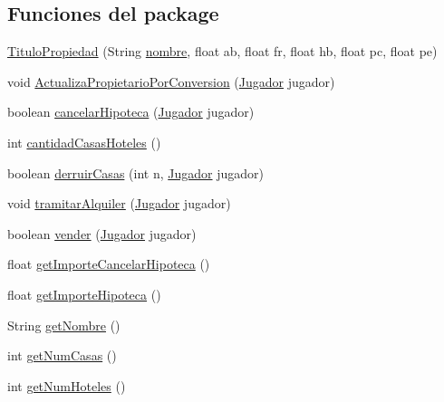 \subsection*{Funciones del \textquotesingle{}package\textquotesingle{}}
\begin{DoxyCompactItemize}
\item 
\hyperlink{classcivitas_1_1TituloPropiedad_ace9e509977e1a3df5ee0cab4cc150622}{Titulo\+Propiedad} (String \hyperlink{classcivitas_1_1TituloPropiedad_a7542ca29c4635b8cb3c56558ed7c5096}{nombre}, float ab, float fr, float hb, float pc, float pe)
\item 
void \hyperlink{classcivitas_1_1TituloPropiedad_a4f7d2ebddd0012032245a7e1c52b6334}{Actualiza\+Propietario\+Por\+Conversion} (\hyperlink{classcivitas_1_1Jugador}{Jugador} jugador)
\item 
boolean \hyperlink{classcivitas_1_1TituloPropiedad_a85a5b8fcd43a0dd67b4700e8bc6dd969}{cancelar\+Hipoteca} (\hyperlink{classcivitas_1_1Jugador}{Jugador} jugador)
\item 
int \hyperlink{classcivitas_1_1TituloPropiedad_ab7971a3c2b326c05da54da18c4f12f4b}{cantidad\+Casas\+Hoteles} ()
\item 
boolean \hyperlink{classcivitas_1_1TituloPropiedad_a61e1dfd0ba431e4ae30c459f93b0c343}{derruir\+Casas} (int n, \hyperlink{classcivitas_1_1Jugador}{Jugador} jugador)
\item 
void \hyperlink{classcivitas_1_1TituloPropiedad_a1147fd3806f6425bf3b8ed802e670e9f}{tramitar\+Alquiler} (\hyperlink{classcivitas_1_1Jugador}{Jugador} jugador)
\item 
boolean \hyperlink{classcivitas_1_1TituloPropiedad_aec443566c1a6c671d2f23054efae091e}{vender} (\hyperlink{classcivitas_1_1Jugador}{Jugador} jugador)
\item 
float \hyperlink{classcivitas_1_1TituloPropiedad_a02c54372a15432b602c8a0bfee1a2876}{get\+Importe\+Cancelar\+Hipoteca} ()
\item 
float \hyperlink{classcivitas_1_1TituloPropiedad_a194b2337d9aa79339654b680d6413940}{get\+Importe\+Hipoteca} ()
\item 
String \hyperlink{classcivitas_1_1TituloPropiedad_aa312f47365906e18b3d55252638c5705}{get\+Nombre} ()
\item 
int \hyperlink{classcivitas_1_1TituloPropiedad_ae424998d9017e8fc1d862c0c170b982f}{get\+Num\+Casas} ()
\item 
int \hyperlink{classcivitas_1_1TituloPropiedad_ab89ae501ad7ed7ddd658f117fb2cd794}{get\+Num\+Hoteles} ()
\item 

\end{DoxyCompactItemize}
